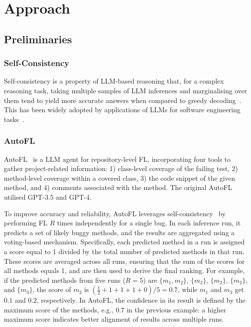 
\section{Approach}
\label{sec:approach}

\subsection{Preliminaries}

\subsubsection{Self-Consistency} Self-consistency is a property of LLM-based reasoning that, for a complex reasoning task, taking multiple samples of LLM inferences and marginalising over them tend to yield more accurate answers when compared to greedy decoding~\cite{wang2022self}. This has been widely adopted by applications of LLMs for software engineering tasks~\cite{Ahmed2023aa,kangQuantitativeQualitativeEvaluation2024a}.

\subsubsection{AutoFL} AutoFL~\cite{kangQuantitativeQualitativeEvaluation2024a} is a LLM agent for repository-level FL, incorporating four tools to gather project-related information: 1) class-level coverage of the failing test, 2) method-level coverage within a covered class, 3) the code snippet of the given method, and 4) comments associated with the method. The original AutoFL utilised GPT-3.5 and GPT-4.

To improve accuracy and reliability, AutoFL leverages self-consistency~\cite{wang2022self} by performing FL $R$ times independently for a single bug. In each inference run, it predicts a set of likely buggy methods, and the results are aggregated using a voting-based mechanism. Specifically, each predicted method in a run is assigned a score equal to 1 divided by the total number of predicted methods in that run. These scores are averaged across all runs, ensuring that the sum of the scores for all methods equals 1, and are then used to derive the final ranking.
For example, if the predicted methods from five runs ($R=5$) are \(\{m_1, m_2\}\), \(\{m_2\}\), \(\{m_2\}\), \(\{m_2\}\), and \(\{m_3\}\), the score of \(m_2\) is \(\left(\frac{1}{2} + 1 + 1 + 1 + 0\right)/5 = 0.7\), while \(m_1\) and \(m_3\) get \(0.1\) and \(0.2\), respectively. In AutoFL, the confidence in its result is defined by the maximum score of the methods, e.g., \(0.7\) in the previous example: a higher maximum score indicates better alignment of results across multiple runs.

